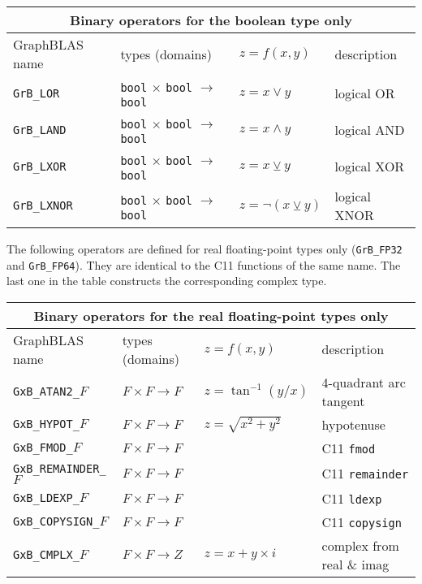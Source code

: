 \documentclass[12pt]{article}
\begin{document}
\vspace{0.2in}
{\footnotesize
\begin{tabular}{|llll|}
\hline
\multicolumn{4}{|c|}{Binary operators for the boolean type only} \\
\hline
GraphBLAS name        & types (domains)            & $z=f(x,y)$      & description \\
\hline
\verb'GrB_LOR'        & \verb'bool'
                        $\times$ \verb'bool'
                        $\rightarrow$ \verb'bool'  & $z = x \vee    y $ & logical OR \\
\verb'GrB_LAND'       & \verb'bool'
                        $\times$ \verb'bool'
                        $\rightarrow$ \verb'bool'  & $z = x \wedge  y $ & logical AND \\
\verb'GrB_LXOR'       & \verb'bool'
                        $\times$ \verb'bool'
                        $\rightarrow$ \verb'bool'  & $z = x \veebar y $ & logical XOR \\
\verb'GrB_LXNOR'      & \verb'bool'
                        $\times$ \verb'bool'
                        $\rightarrow$ \verb'bool'  & $z = \lnot (x \veebar y) $ & logical XNOR \\
\hline
\end{tabular}
}
\vspace{0.2in}

The following operators are defined for real floating-point types only (\verb'GrB_FP32' and  \verb'GrB_FP64').
They are identical to the C11 functions of the same name.  The last one in the table constructs
the corresponding complex type.

\vspace{0.2in}
{\footnotesize
\begin{tabular}{|llll|}
\hline
\multicolumn{4}{|c|}{Binary operators for the real floating-point types only} \\
\hline
GraphBLAS name        & types (domains)            & $z=f(x,y)$      & description \\
\hline
\verb'GxB_ATAN2_'$F$     & $F \times F \rightarrow F$ & $z = \tan^{-1}(y/x)$ & 4-quadrant arc tangent  \\
\verb'GxB_HYPOT_'$F$     & $F \times F \rightarrow F$ & $z = \sqrt{x^2+y^2}$ & hypotenuse \\
\verb'GxB_FMOD_'$F$      & $F \times F \rightarrow F$ &                      & C11 \verb'fmod' \\
\verb'GxB_REMAINDER_'$F$ & $F \times F \rightarrow F$ &                      & C11 \verb'remainder' \\
\verb'GxB_LDEXP_'$F$     & $F \times F \rightarrow F$ &                      & C11 \verb'ldexp' \\
\verb'GxB_COPYSIGN_'$F$  & $F \times F \rightarrow F$ &                      & C11 \verb'copysign' \\
\hline
\verb'GxB_CMPLX_'$F$     & $F \times F \rightarrow Z$ & $z = x + y \times i$ & complex from real \& imag \\
\hline
\end{tabular}
}
\vspace{0.2in}
\end{document}
